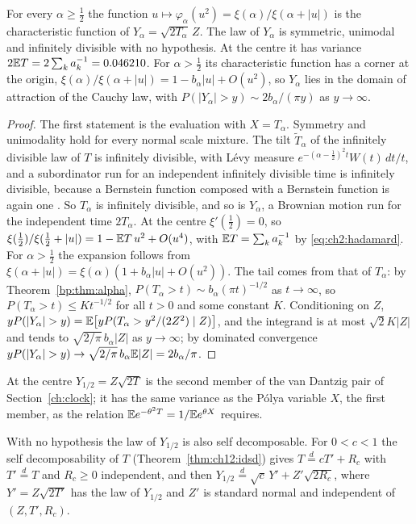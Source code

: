 \begin{proposition}\label{sm:prop:cf}
For every $\alpha\ge\frac12$ the function $u\mapsto\varphi_\alpha(u^2)=\xi(\alpha)/\xi(\alpha+|u|)$ is the characteristic function of $Y_\alpha=\sqrt{2T_\alpha}\,Z$. The law of $Y_\alpha$ is symmetric, unimodal and infinitely divisible with no hypothesis. At the centre it has variance $2\mathbb{E} T=2\sum_ka_k^{-1}=0.046210$. For $\alpha>\frac12$ its characteristic function has a corner at the origin, $\xi(\alpha)/\xi(\alpha+|u|)=1-b_\alpha|u|+O(u^2)$, so $Y_\alpha$ lies in the domain of attraction of the Cauchy law, with $P(|Y_\alpha|>y)\sim2b_\alpha/(\pi y)$ as $y\to\infty$.
\end{proposition}

\begin{proof}
The first statement is the evaluation with $X=T_\alpha$. Symmetry and unimodality hold for every normal scale mixture. The tilt $\widetilde T_\alpha$ of the infinitely divisible law of $T$ is infinitely divisible, with L\'evy measure $e^{-(\alpha-\frac12)^2t}W(t)\,dt/t$, and a subordinator run for an independent infinitely divisible time is infinitely divisible, because a Bernstein function composed with a Bernstein function is again one \cite[Corollary 3.8]{boSSV}. So $T_\alpha$ is infinitely divisible, and so is $Y_\alpha$, a Brownian motion run for the independent time $2T_\alpha$. At the centre $\xi'(\frac12)=0$, so $\xi(\frac12)/\xi(\frac12+|u|)=1-\mathbb{E} T\,u^2+O(u^4)$, with $\mathbb{E} T=\sum_ka_k^{-1}$ by \eqref{eq:ch2:hadamard}. For $\alpha>\frac12$ the expansion follows from $\xi(\alpha+|u|)=\xi(\alpha)(1+b_\alpha|u|+O(u^2))$. The tail comes from that of $T_\alpha$: by Theorem~\ref{bp:thm:alpha}, $P(T_\alpha>t)\sim b_\alpha(\pi t)^{-1/2}$ as $t\to\infty$, so $P(T_\alpha>t)\le Kt^{-1/2}$ for all $t>0$ and some constant $K$. Conditioning on $Z$, $yP(|Y_\alpha|>y)=\E\big[yP(T_\alpha>y^2/(2Z^2)\mid Z)\big]$, and the integrand is at most $\sqrt2K|Z|$ and tends to $\sqrt{2/\pi}\,b_\alpha|Z|$ as $y\to\infty$; by dominated convergence $yP(|Y_\alpha|>y)\to\sqrt{2/\pi}\,b_\alpha\E|Z|=2b_\alpha/\pi$.
\end{proof}

At the centre $Y_{1/2}=Z\sqrt{2T}$ is the second member of the van Dantzig pair of Section~\ref{ch:clock}; it has the same variance as the P\'olya variable $X$, the first member, as the relation $\mathbb{E} e^{-\theta^2T}=1/\mathbb{E} e^{\theta X}$ requires.

With no hypothesis the law of $Y_{1/2}$ is also self decomposable. For $0<c<1$ the self decomposability of $T$ (Theorem~\ref{thm:ch12:idsd}) gives $T\stackrel d=cT'+R_c$ with $T'\stackrel d=T$ and $R_c\ge0$ independent, and then $Y_{1/2}\stackrel d=\sqrt c\,Y'+Z'\sqrt{2R_c}$, where $Y'=Z\sqrt{2T'}$ has the law of $Y_{1/2}$ and $Z'$ is standard normal and independent of $(Z,T',R_c)$.

